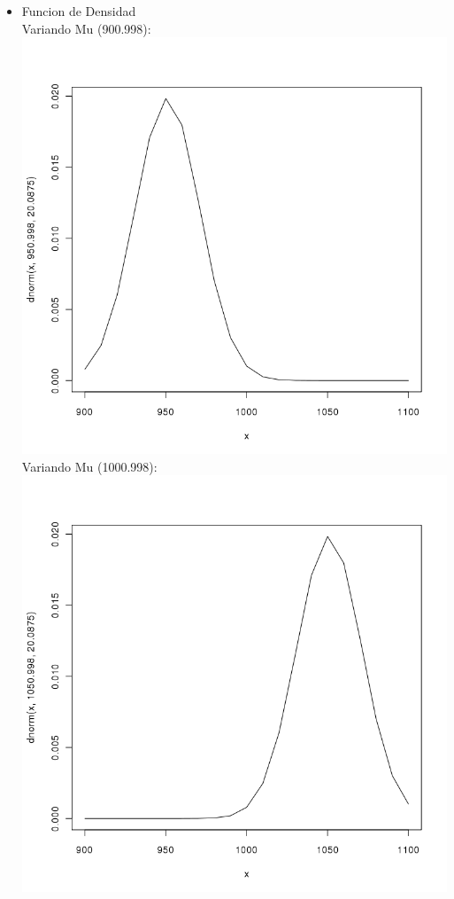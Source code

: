 \begin{itemize}
	\begin{itemize}
		\item Funcion de Densidad\\
	Variando Mu (900.998):\\
	\includegraphics[scale=0.5]{images/2_2-dnorm-variado1}\\
	Variando Mu (1000.998):\\
	\includegraphics[scale=0.5]{images/2_2-dnorm-variado2}\\

\end{itemize}
\end{itemize}
